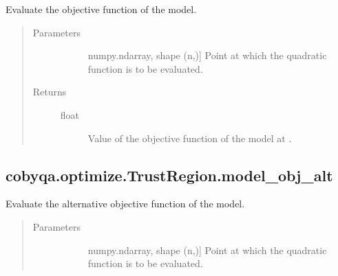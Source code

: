 \documentclass[letterpaper,10pt,english]{sphinxmanual}
\begin{document}
\begin{fulllineitems}
\begin{fulllineitems}
\label{\detokenize{refs/generated/cobyqa.optimize.TrustRegion.model_obj:cobyqa.optimize.TrustRegion.model_obj}}
\sphinxAtStartPar
Evaluate the objective function of the model.
\begin{quote}\begin{description}
\item[{Parameters}] \leavevmode\begin{description}
\item[{}] \leavevmode{[}numpy.ndarray, shape (n,){]}
\sphinxAtStartPar
Point at which the quadratic function is to be evaluated.

\end{description}

\item[{Returns}] \leavevmode\begin{description}
\item[{float}] \leavevmode
\sphinxAtStartPar
Value of the objective function of the model at .

\end{description}

\end{description}\end{quote}

\end{fulllineitems}



\subsection{cobyqa.optimize.TrustRegion.model\_obj\_alt}
\label{\detokenize{refs/generated/cobyqa.optimize.TrustRegion.model_obj_alt:cobyqa-optimize-trustregion-model-obj-alt}}\label{\detokenize{refs/generated/cobyqa.optimize.TrustRegion.model_obj_alt::doc}}

\begin{fulllineitems}
\label{\detokenize{refs/generated/cobyqa.optimize.TrustRegion.model_obj_alt:cobyqa.optimize.TrustRegion.model_obj_alt}}
\sphinxAtStartPar
Evaluate the alternative objective function of the model.
\begin{quote}\begin{description}
\item[{Parameters}] \leavevmode\begin{description}
\item[{}] \leavevmode{[}numpy.ndarray, shape (n,){]}
\sphinxAtStartPar
Point at which the quadratic function is to be evaluated.


\end{description}
\end{description}
\end{quote}
\end{fulllineitems}
\end{fulllineitems}
\end{document}
